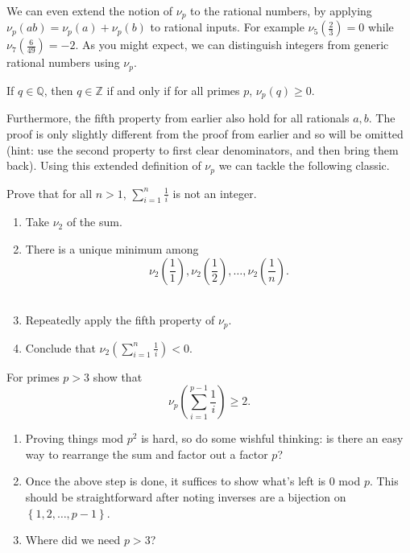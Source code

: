 \documentclass[blue,onecol]{shooting}
\begin{document}
\bigskip
We can even extend the notion of $\nu_p$ to the rational numbers, by applying $\nu_p(ab)=\nu_p(a)+\nu_p(b)$ to rational inputs. For example $\nu_5\left( \frac23 \right)=0$ while $\nu_7\left( \frac6{49} \right)=-2$. As you might expect, we can distinguish integers from generic rational numbers using $\nu_p$.

\begin{fact}
    If $q\in\mathbb Q$, then $q\in\mathbb Z$ if and only if for all primes $p$, $\nu_p(q)\geq 0$.
\end{fact}

Furthermore, the fifth property from earlier also hold for all rationals $a,b$. The proof is only slightly different from the proof from earlier and so will be omitted (hint: use the second property to first clear denominators, and then bring them back). Using this extended definition of $\nu_p$ we can tackle the following classic.

\begin{exam}[Classic]
    Prove that for all $n>1$, $\sum_{i=1}^n\frac1i$ is not an integer.
\end{exam}

\begin{walk}
    \begin{enumerate}
        \item Take $\nu_2$ of the sum.
        \item There is a unique minimum among \[\nu_2\left( \frac11 \right),\nu_2\left( \frac12 \right),\dots,\nu_2\left( \frac1n \right).\]\
        \item Repeatedly apply the fifth property of $\nu_p$.
        \item Conclude that $\nu_2\left( \sum_{i=1}^n\frac1i \right)<0$.
    \end{enumerate}
\end{walk}

\begin{exam}
    For primes $p>3$ show that \[\nu_p\left( \sum_{i=1}^{p-1}\frac1i \right)\geq 2.\]
\end{exam}

\begin{walk}
    \begin{enumerate}
        \item Proving things mod $p^2$ is hard, so do some wishful thinking: is there an easy way to rearrange the sum and factor out a factor $p$?
        \item Once the above step is done, it suffices to show what's left is 0 mod $p$. This should be straightforward after noting inverses are a bijection on $\left\{ 1,2,\dots,p-1 \right\}$.
        \item Where did we need $p>3$?
    \end{enumerate}
\end{walk}
\end{document}
